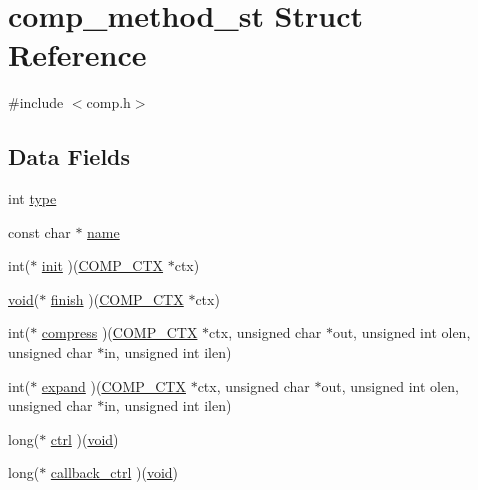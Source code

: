 \hypertarget{structcomp__method__st}{}\section{comp\+\_\+method\+\_\+st Struct Reference}
\label{structcomp__method__st}


{\ttfamily \#include $<$comp.\+h$>$}

\subsection*{Data Fields}
\begin{DoxyCompactItemize}
\item 
int \hyperlink{structcomp__method__st_ac765329451135abec74c45e1897abf26}{type}
\item 
const char $\ast$ \hyperlink{structcomp__method__st_afcd1706c9144e6d6eee6127661ae3be2}{name}
\item 
int($\ast$ \hyperlink{structcomp__method__st_ab77de1e945c28ea8c140ec5917d3e91d}{init} )(\hyperlink{crypto_2comp_2comp_8h_a9aa3298bb113c7c8e26a4f5cb9efb6d5}{C\+O\+M\+P\+\_\+\+C\+TX} $\ast$ctx)
\item 
\hyperlink{hw__4758__cca_8h_afad4d591c7931ff6dc5bf69c76c96aa0}{void}($\ast$ \hyperlink{structcomp__method__st_a4fc226988af06a1772bbf7c12b10141e}{finish} )(\hyperlink{crypto_2comp_2comp_8h_a9aa3298bb113c7c8e26a4f5cb9efb6d5}{C\+O\+M\+P\+\_\+\+C\+TX} $\ast$ctx)
\item 
int($\ast$ \hyperlink{structcomp__method__st_aaeadea1a73e2fca0aeae93a7dd191949}{compress} )(\hyperlink{crypto_2comp_2comp_8h_a9aa3298bb113c7c8e26a4f5cb9efb6d5}{C\+O\+M\+P\+\_\+\+C\+TX} $\ast$ctx, unsigned char $\ast$out, unsigned int olen, unsigned char $\ast$in, unsigned int ilen)
\item 
int($\ast$ \hyperlink{structcomp__method__st_aa83ce140c86f498786966f2badf20454}{expand} )(\hyperlink{crypto_2comp_2comp_8h_a9aa3298bb113c7c8e26a4f5cb9efb6d5}{C\+O\+M\+P\+\_\+\+C\+TX} $\ast$ctx, unsigned char $\ast$out, unsigned int olen, unsigned char $\ast$in, unsigned int ilen)
\item 
long($\ast$ \hyperlink{structcomp__method__st_ae81415e772da7d3a5af55e704bb99ca6}{ctrl} )(\hyperlink{hw__4758__cca_8h_afad4d591c7931ff6dc5bf69c76c96aa0}{void})
\item 
long($\ast$ \hyperlink{structcomp__method__st_a3c5e5970b8ec99724cb34c1110e23780}{callback\+\_\+ctrl} )(\hyperlink{hw__4758__cca_8h_afad4d591c7931ff6dc5bf69c76c96aa0}{void})
\end{DoxyCompactItemize}


